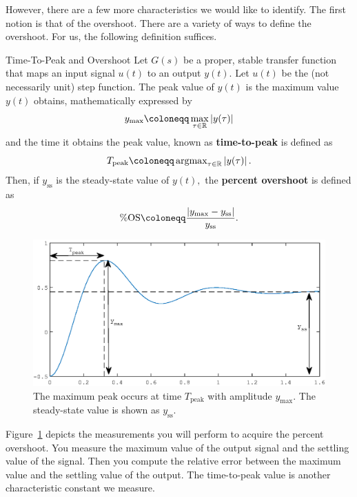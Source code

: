 However, there are a few more characteristics we would like to identify.
The first notion is that of the overshoot. There are a variety of ways
to define the overshoot. For us, the following definition suffices.
%
\begin{definition}[]{Time-To-Peak and Overshoot}
  Let \(G(s)\) be a proper, stable transfer function
  that maps an input signal \(u(t)\) to an output \(y(t).\)
%
  Let \(u(t)\) be the (not necessarily unit) step function. The peak value
  of \(y(t)\) is the maximum value \(y(t)\) obtains, mathematically expressed
  by
  \[
    y_\mathrm{max} \defineas \max_{\tau \in \Real} \left| y(\tau) \right|
  \]
  and the time it obtains the peak value, known as \textbf{time-to-peak}
  is defined as
  \[
    T_\mathrm{peak} \defineas \argmax_{\tau \in \Real} \left| y(\tau) \right|.
  \]
  Then, if \(y_\mathrm{ss}\) is the steady-state value of \(y(t),\) the
  \textbf{percent overshoot} is defined as
  \[
    \%\mathrm{OS}
      \defineas
        \frac{\left| y_\mathrm{max} - y_\mathrm{ss} \right|}{y_\mathrm{ss}}.
  \]
\end{definition}
%
\begin{figure}
  \includegraphics{images/Lab_2_Peak.eps}
  \caption[Depicting Overshoot Measurements for a Second-Order System.]{%
    The maximum peak occurs at time \(T_\mathrm{peak}\) with amplitude
    \(y_\mathrm{max}.\) The steady-state value is shown as \(y_{\mathrm{ss}}.\)
  }
  \label{fig:lab2:peak}
\end{figure}
%
Figure~\ref{fig:lab2:peak} depicts the measurements you will perform to acquire
the percent overshoot. You measure the maximum value of the output
signal and the settling value of the signal. Then you
compute the relative error between the maximum value and the settling value of
the output. The time-to-peak value is another characteristic constant we
measure.
%
